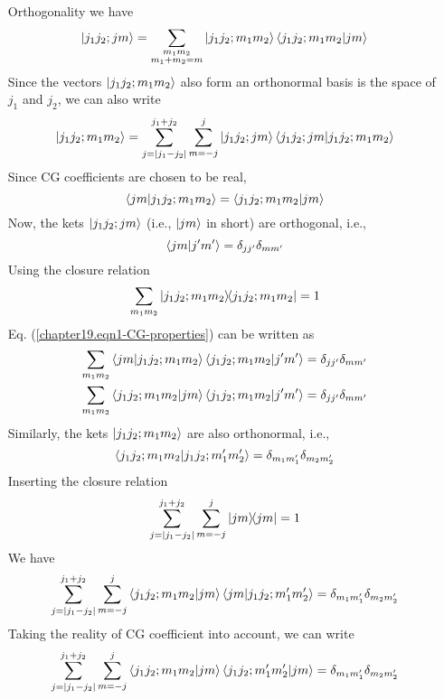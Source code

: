 \begin{enumerate}
	\item[Orthogonality] we have
	\begin{equation}
	\ket{j_1 j_2; j m} = \sum_{\substack{m_1 m_2 \\ m_1 + m_2 = m}} \ket{j_1 j_2; m_1 m_2} \braket{j_1 j_2; m_1 m_2}{j m}
	\end{equation}
	Since the vectors $\ket{j_1 j_2; m_1 m_2}$ also form an orthonormal basis is the space of $j_1$ and $j_2$, we can also write 
	\begin{equation}
	\ket{j_1 j_2; m_1 m_2} = \sum_{j=\abs{j_1 - j_2}}^{j_1 + j_2} \sum_{m=-j}^{j} \ket{j_1 j_2; j m}\braket{j_1 j_2; j m}{j_1 j_2; m_1 m_2}
	\end{equation}
	Since CG coefficients are chosen to be real,
	\begin{equation}
		\braket{j m}{j_1 j_2; m_1 m_2} = \braket{j_1 j_2; m_1 m_2}{j m} 
	\end{equation}
	Now, the kets $\ket{j_1 j_2; j m}$ (i.e., $\ket{j m}$ in short) are orthogonal, i.e.,
	\begin{equation}
	\label{chapter19.eqn1-CG-properties}
	\braket{j m}{j^\prime m^\prime} = \delta_{j j^\prime}\delta_{m m^\prime}
	\end{equation}
	Using the closure relation
	\begin{equation*}
	\sum_{m_1 m_2} \ketbra{j_1 j_2; m_1 m_2}{j_1 j_2; m_1 m_2}  = 1
	\end{equation*}
	Eq. (\ref{chapter19.eqn1-CG-properties}) can be written as
	\begin{align}
	\sum_{m_1 m_2} \braket{j m}{j_1 j_2; m_1 m_2} \braket{j_1 j_2; m_1 m_2}{j^\prime m^\prime} &= \delta_{j j^\prime} \delta_{m m^\prime} \nonumber\\
	\label{chapter19.eqn2-CG-properties}
	\sum_{m_1 m_2}\braket{j_1 j_2; m_1 m_2}{j m}  \braket{j_1 j_2; m_1 m_2}{j^\prime m^\prime} &= \delta_{j j^\prime} \delta_{m m^\prime}
	\end{align}
	Similarly, the kets $\ket{j_1 j_2; m_1 m_2}$ are also orthonormal, i.e.,
	\begin{equation*}
	\braket{j_1 j_2; m_1 m_2}{j_1 j_2; m_1^\prime m_2^\prime} = \delta_{m_1 m_1^\prime} \delta_{m_2 m_2^\prime}
	\end{equation*}
	Inserting the closure relation
	\begin{equation*}
	\sum_{j=\abs{j_1 - j_2}}^{j_1 + j_2} \sum_{m=-j}^{j} \ketbra{j m}{j m} = 1
	\end{equation*}
	We have
	\begin{equation*}
	\sum_{j=\abs{j_1 - j_2}}^{j_1 + j_2} \sum_{m=-j}^{j} \braket{j_1 j_2; m_1 m_2}{j m}\braket{j m}{j_1 j_2; m_1^\prime m_2^\prime} = \delta_{m_1 m_1^\prime} \delta_{m_2 m_2^\prime}
	\end{equation*}
	Taking the reality of CG coefficient into account, we can write
	\begin{equation}
	\label{chapter19.eqn3-CG-properties}
		\sum_{j=\abs{j_1 - j_2}}^{j_1 + j_2} \sum_{m=-j}^{j} \braket{j_1 j_2; m_1 m_2}{j m}\braket{j_1 j_2; m_1^\prime m_2^\prime}{j m} = \delta_{m_1 m_1^\prime} \delta_{m_2 m_2^\prime}
	\end{equation}
\end{enumerate}




